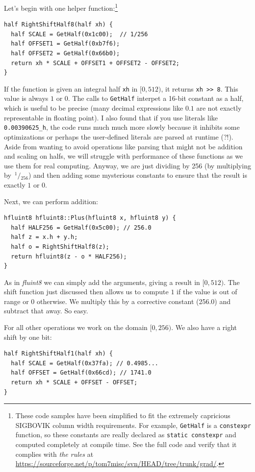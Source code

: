 \documentclass[twocolumn]{article}
\newcommand\sfrac[2]{\!{}\,^{#1}\!/{}\!_{#2}}
\begin{document}
Let's begin with one helper function:\footnote{These code samples have
  been simplified to fit the extremely capricious SIGBOVIK column
  width requirements. For example, \verb+GetHalf+ is a
  \verb+constexpr+ function, so these constants are really declared as
  \verb+static constexpr+ and computed completely at compile time. See
  the full code and verify that it complies with {\it the rules} at
  \url{https://sourceforge.net/p/tom7misc/svn/HEAD/tree/trunk/grad/}.}

\begin{lstlisting}
half RightShiftHalf8(half xh) {
  half SCALE = GetHalf(0x1c00);  // 1/256
  half OFFSET1 = GetHalf(0xb7f6);
  half OFFSET2 = GetHalf(0x66b0);
  return xh * SCALE + OFFSET1 + OFFSET2 - OFFSET2;
}
\end{lstlisting}

If the function is given an integral half \verb+xh+ in $[0, 512)$, it
  returns \verb+xh >> 8+. This value is always $1$ or $0$. The calls
  to \verb+GetHalf+ interpet a 16-bit constant as a half, which is
  useful to be precise (many decimal expressions like $0.1$ are not
  exactly representable in floating point). I also found that if
  you use literals like \verb+0.00390625_h+, the code runs much much
  more slowly because it inhibits some optimizations or perhaps
  the user-defined literals are parsed at runtime (?!). Aside
  from wanting to avoid operations like parsing that might not be
  addition and scaling on halfs, we will struggle with performance
  of these functions as we use them for real computing. Anyway,
  we are just dividing by 256 (by multiplying by $\sfrac{1}{256}$)
  and then adding some mysterious constants to ensure that the
  result is exactly $1$ or $0$.

Next, we can perform addition:

\begin{lstlisting}
hfluint8 hfluint8::Plus(hfluint8 x, hfluint8 y) {
  half HALF256 = GetHalf(0x5c00); // 256.0
  half z = x.h + y.h;
  half o = RightShiftHalf8(z);
  return hfluint8(z - o * HALF256);
}
\end{lstlisting}

As in {\it fluint8} we can simply add the arguments, giving a result
in $[0, 512)$. The shift function just discussed then allows us to
  compute $1$ if the value is out of range or $0$ otherwise. We
  multiply this by a corrective constant (256.0) and subtract that
  away. So easy.

For all other operations we work on the domain $[0, 256)$. We also have
a right shift by one bit:
\begin{lstlisting}
half RightShiftHalf1(half xh) {
  half SCALE = GetHalf(0x37fa); // 0.4985...
  half OFFSET = GetHalf(0x66cd); // 1741.0
  return xh * SCALE + OFFSET - OFFSET;
}
\end{lstlisting}
\end{document}
